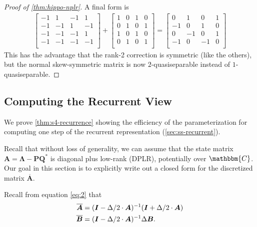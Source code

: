 \begin{proof}[Proof of \cref{thm:hippo-nplr}]
  A final form is
  \begin{align*}
    \begin{bmatrix}
      -1 & 1 & -1 & 1 \\
      -1 & -1 & 1 & -1 \\
      -1 & -1 & -1 & 1 \\
      -1 & -1 & -1 & -1 \\
    \end{bmatrix}
    +
    \begin{bmatrix}
      1 & 0 & 1 & 0 \\
      0 & 1 & 0 & 1 \\
      1 & 0 & 1 & 0 \\
      0 & 1 & 0 & 1 \\
    \end{bmatrix}
    =
    \begin{bmatrix}
      0 & 1 & 0 & 1 \\
      -1 & 0 & 1 & 0 \\
      0 & -1 & 0 & 1 \\
      -1 & 0 & -1 & 0 \\
    \end{bmatrix}
  \end{align*}
  This has the advantage that the rank-2 correction is symmetric (like the others),
  but the normal skew-symmetric matrix is now \( 2 \)-quasiseparable instead of \( 1 \)-quasiseparable.

\end{proof}

\subsection{Computing the \methodabbrv{} Recurrent View}
\label{sec:s4-recurrence-proof}

We prove \cref{thm:s4-recurrence} showing the efficiency of the \methodabbrv{} parameterization for computing one step of the recurrent representation (\cref{sec:ss-recurrent}).

Recall that without loss of generality, we can assume that the state matrix \( \bm{A} = \bm{\Lambda} - \bm{P}\bm{Q}^* \) is diagonal plus low-rank (DPLR), potentially over \( \mathbbm{C} \).
Our goal in this section is to explicitly write out a closed form for the discretized matrix \( \bm{\overline{A}} \).

Recall from equation \eqref{eq:2} that
\begin{align*}
  \bm{\overline{A}} &= (\bm{I} - \Delta/2 \cdot \bm{A})^{-1}(\bm{I} + \Delta/2 \cdot \bm{A}) \\
  \bm{\overline{B}} &= (\bm{I} - \Delta/2 \cdot \bm{A})^{-1} \Delta \bm{B}
  .
\end{align*}



